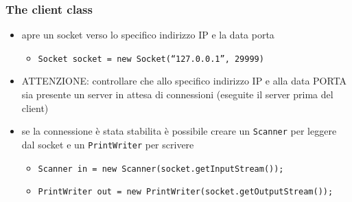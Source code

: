 \documentclass{article}
\begin{document}
\subsubsection{The client class}
\begin{itemize}
\item apre un socket verso lo specifico indirizzo IP e la data porta 
\begin{itemize}
\item \texttt{Socket socket = new Socket(“127.0.0.1”, 29999)}
\end{itemize}
\item ATTENZIONE: controllare che allo specifico indirizzo IP e alla data PORTA sia presente un server in attesa di connessioni (eseguite il server prima del client)
\item se la connessione \`e stata stabilita \`e possibile creare un \texttt{Scanner} per leggere dal socket e un \texttt{PrintWriter} per scrivere
\begin{itemize}
\item \texttt{Scanner in = new Scanner(socket.getInputStream());}
\item \texttt{PrintWriter out = new PrintWriter(socket.getOutputStream());}
\end{itemize}
\end{itemize}
\end{document}
